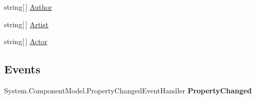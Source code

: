 \begin{DoxyCompactItemize}
\begin{DoxyCompactList}\small\item\em \end{DoxyCompactList}\item 
\hypertarget{class_price___comparison_1_1amazon_1_1ecs_1_1_top_item_set_top_item_a520e232845cd957dfc59b8274f9c5510}{string\mbox{[}$\,$\mbox{]} \hyperlink{class_price___comparison_1_1amazon_1_1ecs_1_1_top_item_set_top_item_a520e232845cd957dfc59b8274f9c5510}{Author}}\label{class_price___comparison_1_1amazon_1_1ecs_1_1_top_item_set_top_item_a520e232845cd957dfc59b8274f9c5510}

\begin{DoxyCompactList}\small\item\em \end{DoxyCompactList}\item 
\hypertarget{class_price___comparison_1_1amazon_1_1ecs_1_1_top_item_set_top_item_a291dd5c7471d49b7de03803ac6675360}{string\mbox{[}$\,$\mbox{]} \hyperlink{class_price___comparison_1_1amazon_1_1ecs_1_1_top_item_set_top_item_a291dd5c7471d49b7de03803ac6675360}{Artist}}\label{class_price___comparison_1_1amazon_1_1ecs_1_1_top_item_set_top_item_a291dd5c7471d49b7de03803ac6675360}

\begin{DoxyCompactList}\small\item\em \end{DoxyCompactList}\item 
\hypertarget{class_price___comparison_1_1amazon_1_1ecs_1_1_top_item_set_top_item_aac341a8794af15c30db92eb1c3a2128c}{string\mbox{[}$\,$\mbox{]} \hyperlink{class_price___comparison_1_1amazon_1_1ecs_1_1_top_item_set_top_item_aac341a8794af15c30db92eb1c3a2128c}{Actor}}\label{class_price___comparison_1_1amazon_1_1ecs_1_1_top_item_set_top_item_aac341a8794af15c30db92eb1c3a2128c}

\begin{DoxyCompactList}\small\item\em \end{DoxyCompactList}\end{DoxyCompactItemize}
\subsection*{Events}
\begin{DoxyCompactItemize}
\item 
\hypertarget{class_price___comparison_1_1amazon_1_1ecs_1_1_top_item_set_top_item_af37b381ecf933f7dfab037ef264f71bf}{System.\-Component\-Model.\-Property\-Changed\-Event\-Handler {\bfseries Property\-Changed}}\label{class_price___comparison_1_1amazon_1_1ecs_1_1_top_item_set_top_item_af37b381ecf933f7dfab037ef264f71bf}

\end{DoxyCompactItemize}
